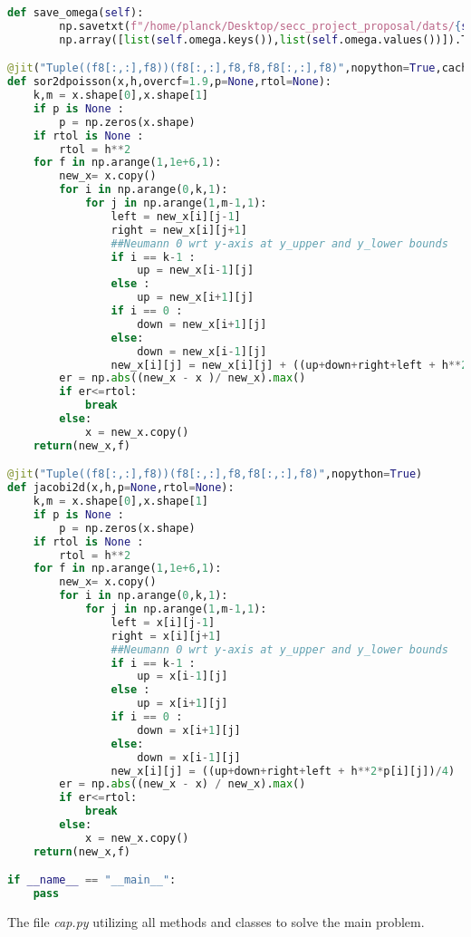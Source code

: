\begin{lstlisting}[language=Python]
    def save_omega(self):
        np.savetxt(f"/home/planck/Desktop/secc_project_proposal/dats/{self.loc}/omega_variation.dat",
        np.array([list(self.omega.keys()),list(self.omega.values())]).T)

@jit("Tuple((f8[:,:],f8))(f8[:,:],f8,f8,f8[:,:],f8)",nopython=True,cache=True)
def sor2dpoisson(x,h,overcf=1.9,p=None,rtol=None):
    k,m = x.shape[0],x.shape[1]
    if p is None :
        p = np.zeros(x.shape)
    if rtol is None :
        rtol = h**2
    for f in np.arange(1,1e+6,1):
        new_x= x.copy()
        for i in np.arange(0,k,1):
            for j in np.arange(1,m-1,1):
                left = new_x[i][j-1]
                right = new_x[i][j+1]
                ##Neumann 0 wrt y-axis at y_upper and y_lower bounds 
                if i == k-1 :
                    up = new_x[i-1][j]
                else :
                    up = new_x[i+1][j]
                if i == 0 :
                    down = new_x[i+1][j]
                else:
                    down = new_x[i-1][j]
                new_x[i][j] = new_x[i][j] + ((up+down+right+left + h**2*p[i][j])/4 - new_x[i][j]) * overcf
        er = np.abs((new_x - x )/ new_x).max()
        if er<=rtol: 
            break
        else:
            x = new_x.copy()
    return(new_x,f)

@jit("Tuple((f8[:,:],f8))(f8[:,:],f8,f8[:,:],f8)",nopython=True)
def jacobi2d(x,h,p=None,rtol=None):
    k,m = x.shape[0],x.shape[1]
    if p is None :
        p = np.zeros(x.shape)
    if rtol is None :
        rtol = h**2
    for f in np.arange(1,1e+6,1):
        new_x= x.copy()
        for i in np.arange(0,k,1):
            for j in np.arange(1,m-1,1):
                left = x[i][j-1]
                right = x[i][j+1]
                ##Neumann 0 wrt y-axis at y_upper and y_lower bounds 
                if i == k-1 :
                    up = x[i-1][j]
                else :
                    up = x[i+1][j]
                if i == 0 :
                    down = x[i+1][j]
                else:
                    down = x[i-1][j]
                new_x[i][j] = ((up+down+right+left + h**2*p[i][j])/4) 
        er = np.abs((new_x - x) / new_x).max()
        if er<=rtol: 
            break
        else:
            x = new_x.copy()
    return(new_x,f)

if __name__ == "__main__":
    pass

\end{lstlisting}
The file \textit{cap.py} utilizing all methods and classes to solve the main problem.
